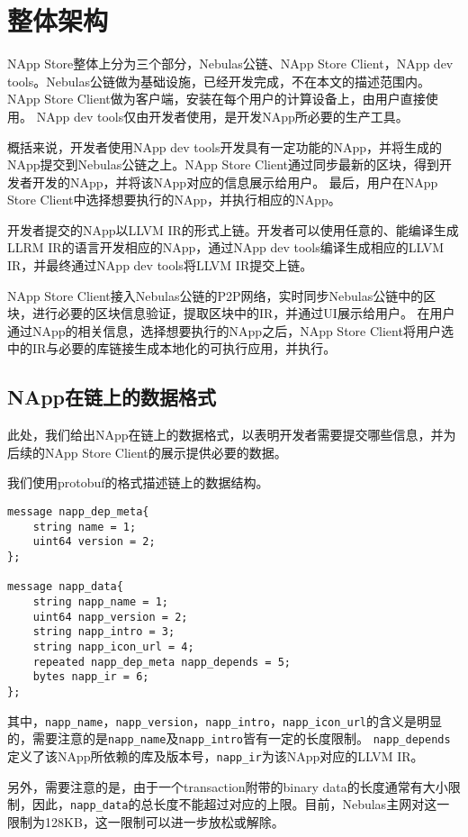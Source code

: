 \section{整体架构}

NApp Store整体上分为三个部分，Nebulas公链、NApp Store Client，NApp dev tools。Nebulas公链做为基础设施，已经开发完成，不在本文的描述范围内。NApp Store Client做为客户端，安装在每个用户的计算设备上，由用户直接使用。
NApp dev tools仅由开发者使用，是开发NApp所必要的生产工具。

概括来说，开发者使用NApp dev tools开发具有一定功能的NApp，并将生成的NApp提交到Nebulas公链之上。NApp Store Client通过同步最新的区块，得到开发者开发的NApp，并将该NApp对应的信息展示给用户。
最后，用户在NApp Store Client中选择想要执行的NApp，并执行相应的NApp。

开发者提交的NApp以LLVM IR的形式上链。开发者可以使用任意的、能编译生成LLRM IR的语言开发相应的NApp，通过NApp dev tools编译生成相应的LLVM IR，并最终通过NApp dev tools将LLVM IR提交上链。

NApp Store Client接入Nebulas公链的P2P网络，实时同步Nebulas公链中的区块，进行必要的区块信息验证，提取区块中的IR，并通过UI展示给用户。
在用户通过NApp的相关信息，选择想要执行的NApp之后，NApp Store Client将用户选中的IR与必要的库链接生成本地化的可执行应用，并执行。

\subsection{NApp在链上的数据格式}
此处，我们给出NApp在链上的数据格式，以表明开发者需要提交哪些信息，并为后续的NApp Store Client的展示提供必要的数据。

我们使用protobuf的格式描述链上的数据结构。
\begin{verbatim}
message napp_dep_meta{
    string name = 1;
    uint64 version = 2;
};

message napp_data{
    string napp_name = 1;
    uint64 napp_version = 2;
    string napp_intro = 3;
    string napp_icon_url = 4;
    repeated napp_dep_meta napp_depends = 5;
    bytes napp_ir = 6;
};

\end{verbatim}
\noindent 其中，\texttt{napp\_name}，\texttt{napp\_version}，\texttt{napp\_intro}，\texttt{napp\_icon\_url}的含义是明显的，需要注意的是\texttt{napp\_name}及\texttt{napp\_intro}皆有一定的长度限制。
\texttt{napp\_depends}定义了该NApp所依赖的库及版本号，\texttt{napp\_ir}为该NApp对应的LLVM IR。

另外，需要注意的是，由于一个transaction附带的binary data的长度通常有大小限制，因此，\texttt{napp\_data}的总长度不能超过对应的上限。目前，Nebulas主网对这一限制为128KB，这一限制可以进一步放松或解除。

